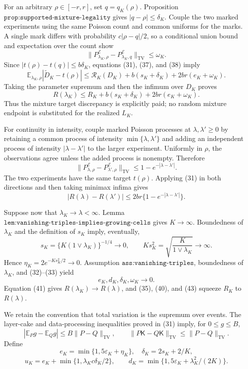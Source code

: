 For an arbitrary \(\rho\in[-r,r]\), set \(q=q_K(\rho)\).
Proposition \(\texttt{prop:supported-mixture-legality}\) gives
\(|q-\rho|\le\delta_K\).  Couple the two marked experiments using the
same Poisson count and common uniforms for the marks.  A single mark
differs with probability \(c|\rho-q|/2\), so a conditional union bound
and expectation over the count show
\[
 \|P^{\mathcal E}_{\lambda_K,\rho}
   -P^{\mathcal E}_{\lambda_K,q}\|_{\mathrm{TV}}
 \le\omega_K.
 \tag{38}
\]
Since \(|t(\rho)-t(q)|\le b\delta_K\), equations (31), (37), and (38)
imply
\[
 \mathbb E_{\lambda_K,\rho}|\widetilde D_K-t(\rho)|
 \le
 \mathcal R_K(D_K)+b(s_K+\delta_K)
 +2br(e_K+\omega_K).
 \tag{39}
\]
Taking the parameter supremum and then the infimum over \(D_K\) proves
\[
 R(\lambda_K)
 \le R_K+b(s_K+\delta_K)+2br(e_K+\omega_K).
 \tag{40}
\]
Thus the mixture target discrepancy is explicitly paid; no random
mixture endpoint is substituted for the realized \(L_K\).

For continuity in intensity, couple marked Poisson processes at
\(\lambda,\lambda'\ge0\) by retaining a common process of intensity
\(\min\{\lambda,\lambda'\}\) and adding an independent process of
intensity \(|\lambda-\lambda'|\) to the larger experiment.  Uniformly in
\(\rho\), the observations agree unless the added process is nonempty.
Therefore
\[
 \|P^{\mathcal E}_{\lambda,\rho}
   -P^{\mathcal E}_{\lambda',\rho}\|_{\mathrm{TV}}
 \le1-e^{-|\lambda-\lambda'|}.
\]
The two experiments have the same target \(t(\rho)\).  Applying (31) in
both directions and then taking minimax infima gives
\[
 |R(\lambda)-R(\lambda')|
 \le2br\{1-e^{-|\lambda-\lambda'|}\}.
 \tag{41}
\]

Suppose now that \(\lambda_K\to\lambda<\infty\).
Lemma \(\texttt{lem:vanishing-triples-implies-growing-cells}\) gives
\(K\to\infty\).  Boundedness of \(\lambda_K\) and the definition of
\(s_K\) imply, eventually,
\[
 s_K=\{K(1\vee\lambda_K)\}^{-1/4}\to0,
 \qquad
 Ks_K^2=\sqrt{\frac{K}{1\vee\lambda_K}}\to\infty.
 \tag{42}
\]
Hence \(\eta_K=2e^{-Ks_K^2/2}\to0\).  Assumption
\(\texttt{ass:vanishing-triples}\), boundedness of \(\lambda_K\), and
(32)--(33) yield
\[
 e_K,d_K,\delta_K,\omega_K\longrightarrow0.
 \tag{43}
\]
Equation (41) gives \(R(\lambda_K)\to R(\lambda)\), and (35), (40), and
(43) squeeze \(R_K\) to \(R(\lambda)\).

We retain the convention that total variation is the supremum over
events.  The layer-cake and data-processing inequalities proved in
(31) imply, for \(0\le g\le B\),
\[
 |\mathbb E_Pg-\mathbb E_Qg|
 \le B\|P-Q\|_{\mathrm{TV}},
 \qquad
 \|P\mathsf K-Q\mathsf K\|_{\mathrm{TV}}
 \le\|P-Q\|_{\mathrm{TV}}.
 \tag{44}
\]
Define
\[
 e_K=\min\{1,5\varepsilon_K+\eta_K\},\quad
 \delta_K=2s_K+2/K,
\]
\[
 u_K=e_K+\min\{1,\lambda_Kc\delta_K/2\},
 \qquad
 d_K=\min\{1,5\varepsilon_K+\lambda_K^2/(2K)\}.
 \tag{45}
\]

